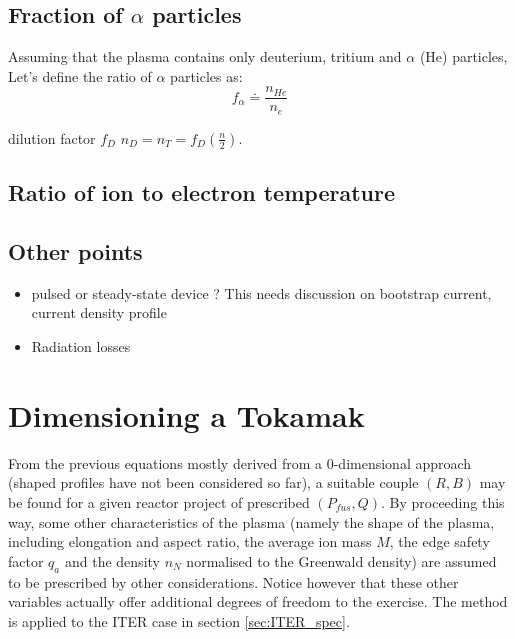 \subsection{Fraction of $\alpha$ particles}
Assuming that the plasma contains only deuterium, tritium and $\alpha$ (He) particles, 
Let's define the ratio of $\alpha$ particles as:
\begin{equation}
f_\alpha
\doteq
\frac{n_{He}}{n_e}
\end{equation}

dilution factor $f_D$ $n_D = n_T = f_D \left( \frac{n}{2} \right)$. 


\subsection{Ratio of ion to electron temperature}


\subsection{Other points}
\begin{itemize}
	\item pulsed or steady-state device ? This needs discussion on bootstrap current, current density profile
	\item Radiation losses
\end{itemize} 

\section{Dimensioning a Tokamak}
From the previous equations mostly derived from a 0-dimensional approach (shaped profiles have not been considered so far), a suitable couple $(R, B)$ may be found for a given reactor project of prescribed $(P_{fus}, Q)$. By proceeding this way, some other characteristics of the plasma (namely the shape of the plasma, including elongation and aspect ratio, the average ion mass $\hat M$, the edge safety factor $q_a$ and the density $n_N$ normalised to the Greenwald density) are assumed to be prescribed by other considerations. Notice however that these other variables actually offer additional degrees of freedom to the exercise. The method is applied to the ITER case in section \ref{sec:ITER_spec}.

